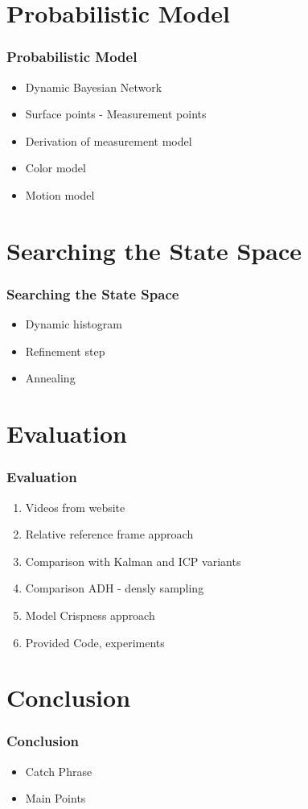 \section{Probabilistic Model}
\begin{frame}
  \frametitle{Probabilistic Model}
  \begin{itemize}
  \item Dynamic Bayesian Network
  \item Surface points - Measurement points
  \item Derivation of measurement model
  \item Color model
  \item Motion model
  \end{itemize}
\end{frame}

\section{Searching the State Space}
\begin{frame}
  \frametitle{Searching the State Space}
  \begin{itemize}
  \item Dynamic histogram
  \item Refinement step
  \item Annealing
  \end{itemize}
\end{frame}

\section{Evaluation}
\begin{frame}
  \frametitle{Evaluation}
  \begin{enumerate}
  \item Videos from website
  \item Relative reference frame approach
  \item Comparison with Kalman and ICP variants
  \item Comparison ADH - densly sampling
  \item Model Crispness approach
  \item Provided Code, experiments
  \end{enumerate}
\end{frame}

\section{Conclusion}
\begin{frame}
  \frametitle{Conclusion}
  \begin{itemize}
  \item Catch Phrase
  \item Main Points
  \end{itemize}
\end{frame}



